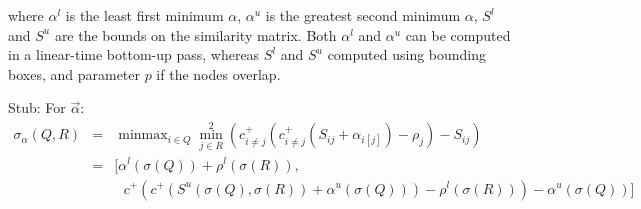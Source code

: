 \documentclass{article}
\DeclareMathOperator*{\minmax}{minmax}
\newcommand{\cpos}[2]{c^{+}_{#1 \neq #2}}
\newcommand{\simil}[2]{S_{#1#2}}
\newcommand{\vecalpha}{\vec{\alpha}}
\newcommand{\frho}[1]{\rho_{#1}}
\newcommand{\falphaj}[2]{\alpha_{#1[#2]}}
\newcommand{\falphamax}{\alpha^{u}}
\newcommand{\falphamin}{\alpha^{l}}
\newcommand{\frhomin}{\rho^{l}}
\begin{document}
\noindent where $\falphamin$ is the least first minimum $\alpha$, $\falphamax$ is the greatest second minimum $\alpha$, $S^l$ and $S^u$ are the bounds on the similarity matrix.
Both $\falphamin$ and $\falphamax$ can be computed in a linear-time bottom-up pass, whereas $S^l$ and $S^u$ computed using bounding boxes, and parameter $p$ if the nodes overlap.

Stub: For $\vecalpha$:
$$
  \begin{array}{rcl}
    \sigma_{\alpha}(Q,R) &=& \minmax_{i \in Q} \min^2_{j \in R} ( \cpos{i}{j}(\cpos{i}{j}(\simil{i}{j} + \falphaj{i}{j}) - \frho{j}) - \simil{i}{j} )
    \\
        &=& [
        \falphamin(\sigma(Q)) + \frhomin(\sigma(R)),
    \\ && \text{  }
          c^{+}(c^{+}(S^u(\sigma(Q), \sigma(R)) + \falphamax(\sigma(Q))) - \frhomin(\sigma(R))) - \falphamax(\sigma(Q))
        ]
  \end{array}
$$
\end{document}
